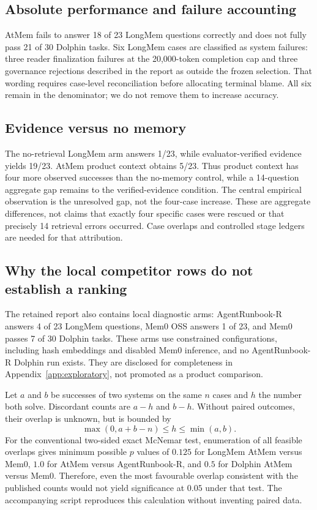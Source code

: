 \documentclass[10pt,twocolumn]{article}
\begin{document}
\subsection{Absolute performance and failure accounting}
AtMem fails to answer 18 of 23 LongMem questions correctly and does not fully pass 21 of 30 Dolphin tasks. Six LongMem cases are classified as system failures: three reader finalization failures at the 20,000-token completion cap and three governance rejections described in the report as outside the frozen selection. That wording requires case-level reconciliation before allocating terminal blame. All six remain in the denominator; we do not remove them to increase accuracy.

\subsection{Evidence versus no memory}
The no-retrieval LongMem arm answers 1/23, while evaluator-verified evidence yields 19/23. AtMem product context obtains 5/23. Thus product context has four more observed successes than the no-memory control, while a 14-question aggregate gap remains to the verified-evidence condition. The central empirical observation is the unresolved gap, not the four-case increase. These are aggregate differences, not claims that exactly four specific cases were rescued or that precisely 14 retrieval errors occurred. Case overlaps and controlled stage ledgers are needed for that attribution.

\subsection{Why the local competitor rows do not establish a ranking}
The retained report also contains local diagnostic arms: AgentRunbook-R answers 4 of 23 LongMem questions, Mem0 OSS answers 1 of 23, and Mem0 passes 7 of 30 Dolphin tasks. These arms use constrained configurations, including hash embeddings and disabled Mem0 inference, and no AgentRunbook-R Dolphin run exists. They are disclosed for completeness in Appendix~\ref{app:exploratory}, not promoted as a product comparison.

Let $a$ and $b$ be successes of two systems on the same $n$ cases and $h$ the number both solve. Discordant counts are $a-h$ and $b-h$. Without paired outcomes, their overlap is unknown, but is bounded by
\begin{equation}
 \max(0,a+b-n)\leq h\leq\min(a,b).
\end{equation}
For the conventional two-sided exact McNemar test, enumeration of all feasible overlaps gives minimum possible $p$ values of $0.125$ for LongMem AtMem versus Mem0, $1.0$ for AtMem versus AgentRunbook-R, and $0.5$ for Dolphin AtMem versus Mem0. Therefore, even the most favourable overlap consistent with the published counts would not yield significance at $0.05$ under that test. The accompanying script reproduces this calculation without inventing paired data.
\end{document}

